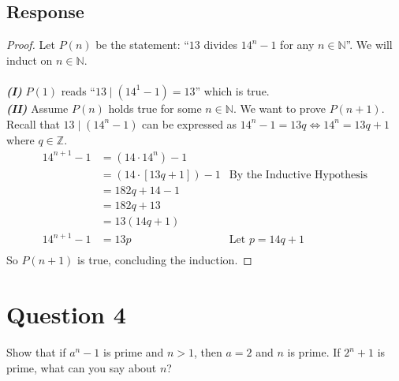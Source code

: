 \documentclass[13pt]{article}
\begin{document}
\subsection*{Response}
\begin{proof}
  Let $P(n)$ be the statement: ``$13$ divides $14^n - 1$ for any $n \in \mathbb{N}$''. We will
  induct on $n \in \mathbb{N}$. \\ \\
  \textbf{\textit{(I)}} $P(1)$ reads ``$13 \mid (14^1 - 1) = 13$'' which is true. \\
  \textbf{\textit{(II)}} Assume $P(n)$ holds true for some $n \in \mathbb{N}$. We want to prove $P(n
  + 1)$.  Recall that $13 \mid (14^n - 1)$ can be expressed as $14^n - 1 = 13q \iff 14^n = 13q + 1$
  where $q \in \mathbb{Z}$.
  \begin{align*}
    14^{n + 1} - 1 &= (14 \cdot 14^n) - 1 \\
                   &= (14 \cdot [13q + 1]) - 1 & \text{By the Inductive Hypothesis} \\
                   &= 182q + 14 - 1 \\
                   &= 182q + 13 \\
                   &= 13 (14q + 1) \\
    14^{n + 1} - 1 &= 13p & \text{Let $p = 14q + 1$} \\
  \end{align*}
  So $P(n + 1)$ is true, concluding the induction.
\end{proof}





\newpage
\section*{Question 4}
Show that if $a^n - 1$ is prime and $n > 1$, then $a = 2$ and $n$ is prime. If $2^n + 1$ is prime,
what can you say about $n$?
\end{document}

